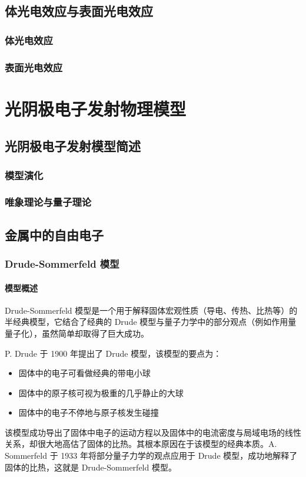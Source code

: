 \documentclass[ignorenonframetext, t]{beamer}
\begin{document}
\subsection{体光电效应与表面光电效应}

\begin{frame}
	\frametitle{体光电效应}
\end{frame}

\begin{frame}
	\frametitle{表面光电效应}
\end{frame}

\section{光阴极电子发射物理模型}

\subsection{光阴极电子发射模型简述}

\begin{frame}
	\frametitle{模型演化}
\end{frame}

\begin{frame}
	\frametitle{唯象理论与量子理论}
\end{frame}

\subsection{金属中的自由电子}

\begin{frame}
	\frametitle{Drude-Sommerfeld 模型}
	\framesubtitle{模型概述}
	Drude-Sommerfeld 模型是一个用于解释固体宏观性质（导电、传热、比热等）的半经典模型，它结合了经典的 Drude 模型与量子力学中的部分观点（例如作用量量子化），虽然简单却取得了巨大成功。
	\begin{background}
	P. Drude 于 1900 年提出了 Drude 模型，该模型的要点为：
	\begin{itemize}
	\item 固体中的电子可看做经典的带电小球
	\item 固体中的原子核可视为极重的几乎静止的大球
	\item 固体中的电子不停地与原子核发生碰撞
	\end{itemize}
	该模型成功导出了固体中电子的运动方程以及固体中的电流密度与局域电场的线性关系，却很大地高估了固体的比热。其根本原因在于该模型的经典本质。A. Sommerfeld 于 1933 年将部分量子力学的观点应用于 Drude 模型，成功地解释了固体的比热，这就是 Drude-Sommerfeld 模型。
	\end{background}
\end{frame}
\end{document}
